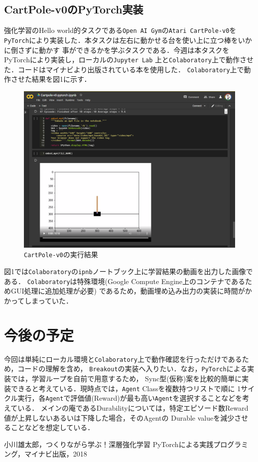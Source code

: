 \documentclass[11pt,a4paper]{jsarticle}
\begin{document}
\subsection{CartPole-v0のPyTorch実装}
強化学習のHello world的タスクである\texttt{Open AI Gym}の\texttt{Atari CartPole-v0}を
\texttt{PyTorch}により実装した．本タスクは左右に動かせる台を使い上に立つ棒をいかに倒さずに動かす
事ができるかを学ぶタスクである．今週は本タスクをPyTorchにより実装し，ローカルの\texttt{Jupyter Lab}
上と\texttt{Colaboratory}上で動作させた．コードはマイナビより出版されている本\cite{book1}を使用した．
\texttt{Colaboratory}上で動作させた結果を図1に示す．
\begin{figure}[htbp]
  \begin{center}
    \includegraphics[width=14cm]{fig1.png}
    \caption{\texttt{CartPole-v0}の実行結果}
  \end{center}
  \label{fig1}
\end{figure}
図1では\texttt{Colaboratory}の\texttt{ipnb}ノートブック上に学習結果の動画を出力した画像である．
\texttt{Colaboratory}は特殊環境(Google Compute Engine上のコンテナであるためGUI処理に追加処理が必要)
であるため，動画埋め込み出力の実装に時間がかかってしまっていた．


\section{今後の予定}
今回は単純にローカル環境と\texttt{Colaboratory}上で動作確認を行っただけであるため，コードの理解を含め，
\texttt{Breakout}の実装へ入りたい．なお，\texttt{PyTorch}による実装では，学習ループを自前で用意するため，
Sync型(仮称)案を比較的簡単に実装できると考えている．現時点では，\texttt{Agent} Classを複数持つリストで順に
1サイクル実行，各\texttt{Agent}で評価値(Reward)が最も高い\texttt{Agent}を選択することなどを考えている．
メインの庵であるDurabilityについては，特定エピソード数Reward値が上昇しないあるいは下降した場合，そのAgentの
Durable valueを減少させることなどを想定している．

\begin{thebibliography}{1}
   小川雄太郎，つくりながら学ぶ！深層強化学習 PyTorchによる実践プログラミング，マイナビ出版，2018
\end{thebibliography}
\end{document}
